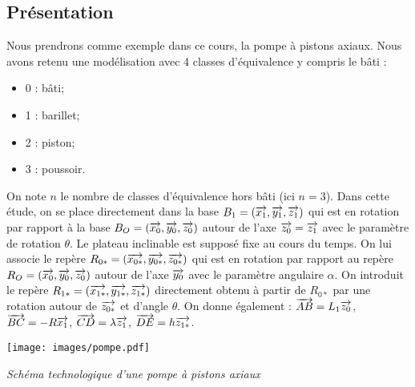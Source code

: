 \documentclass[10pt,fleqn]{article} %
\begin{document}
\def\pathfig{images}

\vspace{4.5cm}
\pagestyle{fancy}
\thispagestyle{plain}

\def\columnseprulecolor{\color{ocre}}
\setlength{\columnseprule}{0.4pt} 

\def\pathfig{images}


\ifprof
\begin{multicols}{2}
\else
\begin{multicols}{2}
\fi
%




\subsection*{Présentation}
Nous prendrons comme exemple dans ce cours, la pompe à pistons axiaux. Nous avons retenu une modélisation avec 4 classes d'équivalence y compris le bâti :

\begin{itemize}
\item 0 : bâti;
\item 1 : barillet;
\item 2 : piston;
\item 3 : poussoir.
\end{itemize}

On note $n$ le nombre de classes d'équivalence hors bâti (ici $n=3$).
Dans cette étude, on se place directement dans la base $B_{1}=\left(\overrightarrow{{x_{1}}},\overrightarrow{{y_{1}}},\overrightarrow{{z_{1}}} \right)$ qui est en rotation par rapport à la base $B_{O}=\left(\overrightarrow{{x_{0}}},\overrightarrow{{y_{0}}},\overrightarrow{{z_{0}}} \right)$ autour de l'axe $\overrightarrow{z_{0}}=\overrightarrow{z_{1}}$ avec le paramètre de rotation $\theta$.
Le plateau inclinable est supposé fixe au cours du temps. On lui associe le repère $R_{0*}=\left(\overrightarrow{{x_{0*}}},\overrightarrow{{y_{0*}}},\overrightarrow{{z_{0*}}} \right)$ qui est en rotation par rapport au repère $R_{O}=\left(\overrightarrow{{x_{0}}},\overrightarrow{{y_{0}}},\overrightarrow{{z_{0}}} \right)$ autour de l'axe $\overrightarrow{y_{0}}$ avec le paramètre angulaire $\alpha$. On introduit le repère $R_{1*}=\left(\overrightarrow{{x_{1*}}},\overrightarrow{{y_{1*}}},\overrightarrow{{z_{1*}}} \right)$ directement obtenu à partir de $R_{0*}$ par une rotation autour de $\overrightarrow{z_{0*}}$ et d'angle $\theta$.
On donne également :
$\overrightarrow{AB}=L_1\overrightarrow{z_0}$, $\overrightarrow{BC}=-R\overrightarrow{x_1}$, $\overrightarrow{CD}=\lambda\overrightarrow{z_1}$, $\overrightarrow{DE}=h\overrightarrow{z_{1*}}$.


\begin{center}
  \texttt{[image: images/pompe.pdf]}
  
  \textit{Schéma technologique d'une pompe à pistons axiaux \label{fig:techno_pompe}}


\end{center}
\end{multicols}
\end{multicols}
\end{document}
